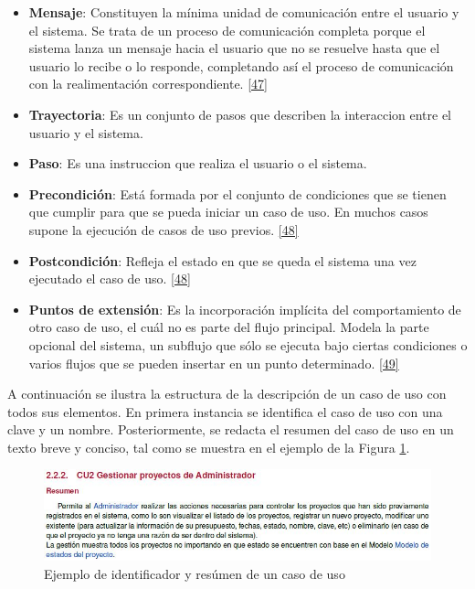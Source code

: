 \begin{itemize}
\item \textbf{Mensaje}: Constituyen la mínima unidad de comunicación entre el usuario y el sistema. Se trata de un proceso de comunicación completa porque el sistema lanza un mensaje hacia el usuario que no se resuelve hasta que el usuario lo recibe o lo responde, completando así el proceso de comunicación con la realimentación correspondiente. \hyperlink{b47}{[47]}

\item \textbf{Trayectoria}: Es un conjunto de pasos que describen la interaccion entre el usuario y el sistema.

\item \textbf{Paso}: Es una instruccion que realiza el usuario o el sistema.

\item \textbf{Precondición}: Está formada por el conjunto de condiciones que se tienen que cumplir para que se pueda iniciar un caso de uso. En muchos casos supone la ejecución de casos de uso previos. \hyperlink{b48}{[48]}

\item \textbf{Postcondición}: Refleja el estado en que se queda el sistema una vez ejecutado el caso de uso. \hyperlink{b48}{[48]}

\item \textbf{Puntos de extensión}: Es la incorporación implícita del comportamiento de otro caso de uso, el cuál no es parte del flujo principal. Modela la parte opcional del sistema, un subflujo que sólo se ejecuta bajo ciertas condiciones o varios flujos que se pueden insertar en un punto determinado. \hyperlink{b49}{[49]}
\end{itemize}

A continuación se ilustra la estructura de la descripción de un caso de uso con todos sus elementos. En primera instancia se identifica el caso de uso con una clave y un nombre. Posteriormente, se redacta el resumen del caso de uso en un texto breve y conciso, tal como se muestra en el ejemplo de la Figura \ref{fig:resu}.

\begin{figure}[H]
	\begin{center}
		\includegraphics[width=1\textwidth]{images/marcoteorico/resumen}
		\caption{Ejemplo de identificador y resúmen de un caso de uso}
		\label{fig:resu}
	\end{center}
\end{figure}

